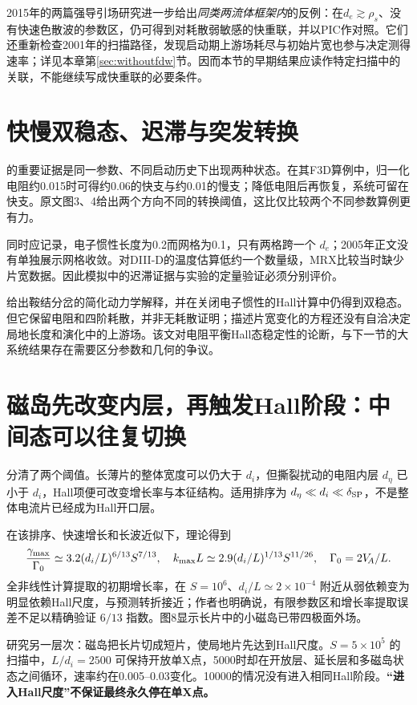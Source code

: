 2015年的两篇强导引场研究进一步给出\emph{同类两流体框架内}的反例：在$d_e\gtrsim\rho_s$、没有快速色散波的参数区，仍可得到对耗散弱敏感的快重联，并以PIC作对照。它们还重新检查2001年的扫描路径，发现启动期上游场耗尽与初始片宽也参与决定测得速率；详见本章第\ref{sec:withoutfdw}节。因而本节的早期结果应读作特定扫描中的关联，不能继续写成快重联的必要条件。\citep{L216,L217}

\section{快慢双稳态、迟滞与突发转换}
\citet{Cassak2005}的重要证据是同一参数、不同启动历史下出现两种状态。在其F3D算例中，归一化电阻约0.015时可得约0.06的快支与约0.01的慢支；降低电阻后再恢复，系统可留在快支。原文图3、4给出两个方向不同的转换阈值，这比仅比较两个不同参数算例更有力。

同时应记录，电子惯性长度为0.2而网格为0.1，只有两格跨一个 $d_e$；2005年正文没有单独展示网格收敛。对DIII-D的温度估算低约一个数量级，MRX比较当时缺少片宽数据。因此模拟中的迟滞证据与实验的定量验证必须分别评价。

\citet{Cassak2010}给出鞍结分岔的简化动力学解释，并在关闭电子惯性的Hall计算中仍得到双稳态。但它保留电阻和四阶耗散，并非无耗散证明；描述片宽变化的方程还没有自洽决定局地长度和演化中的上游场。该文对电阻平衡Hall态稳定性的论断，与下一节的大系统结果存在需要区分参数和几何的争议。

\section{磁岛先改变内层，再触发Hall阶段：中间态可以往复切换}
\citet{Baalrud2011}分清了两个阈值。长薄片的整体宽度可以仍大于 $d_i$，但撕裂扰动的电阻内层 $d_\eta$ 已小于 $d_i$，Hall项便可改变增长率与本征结构。适用排序为 $d_\eta\ll d_i\ll\delta_{\rm SP}$，不是整体电流片已经成为Hall开口层。

在该排序、快速增长和长波近似下，理论得到
\begin{equation}
{\gamma_{\max}\over\Gamma_0}\simeq3.2(d_i/L)^{6/13}S^{7/13},\quad
k_{\max}L\simeq2.9(d_i/L)^{1/13}S^{11/26},\quad\Gamma_0=2V_{\!A}/L.
\end{equation}
全非线性计算提取的初期增长率，在 $S=10^6$、$d_i/L\simeq2\times10^{-4}$ 附近从弱依赖变为明显依赖Hall尺度，与预测转折接近；作者也明确说，有限参数区和增长率提取误差不足以精确验证 $6/13$ 指数。图8显示长片中的小磁岛已带四极面外场。

\citet{Huang2011}研究另一层次：磁岛把长片切成短片，使局地片先达到Hall尺度。$S=5\times10^5$ 的扫描中，$L/d_i=2500$ 可保持开放单X点，5000时却在开放层、延长层和多磁岛状态之间循环，速率约在0.005--0.03变化。10000的情况没有进入相同Hall阶段。\textbf{“进入Hall尺度”不保证最终永久停在单X点。}

